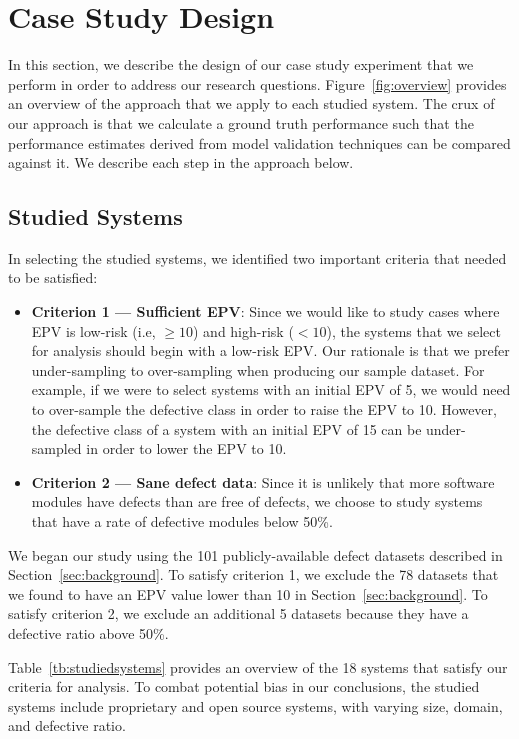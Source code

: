 
\section{Case Study Design}\label{sec:design}

In this section, we describe the design of our case study experiment that we perform in order to address our research questions.
Figure~\ref{fig:overview} provides an overview of the approach that we apply to each studied system.
The crux of our approach is that we calculate a ground truth performance such that the performance estimates derived from model validation techniques can be compared against it.
We describe each step in the approach below.

\subsection{Studied Systems}

In selecting the studied systems, we identified two important criteria that needed to be satisfied:

\begin{itemize}
\item \textbf{Criterion 1 --- Sufficient EPV}:
  Since we would like to study cases where EPV is low-risk (i.e, $\ge 10$) and high-risk ($< 10$), the systems that we select for analysis should begin with a low-risk EPV.
  Our rationale is that we prefer under-sampling to over-sampling when producing our sample dataset.
  For example, if we were to select systems with an initial EPV of 5, we would need to over-sample the defective class in order to raise the EPV to 10.
  However, the defective class of a system with an initial EPV of 15 can be under-sampled in order to lower the EPV to 10.

\item \textbf{Criterion 2 --- Sane defect data}:
  Since it is unlikely that more software modules have defects than are free of defects, we choose to study systems that have a rate of defective modules below 50\%.

\end{itemize}

We began our study using the 101 publicly-available defect datasets described in Section~\ref{sec:background}. 
To satisfy criterion 1, we exclude the 78 datasets that we found to have an EPV value lower than 10 in Section~\ref{sec:background}.
To satisfy criterion 2, we exclude an additional 5 datasets because they have a defective ratio above 50\%.

Table~\ref{tb:studiedsystems} provides an overview of the 18 systems that satisfy our criteria for analysis.
To combat potential bias in our conclusions, the studied systems include proprietary and open source systems, with varying size, domain, and defective ratio.


